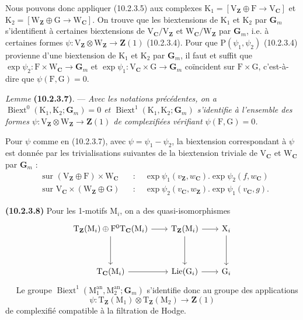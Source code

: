 \documentclass[11pt,leqno]{article}
\newcommand{\Page}[1]{\ifvmode\noindent\else\unskip\ \fi{\footnotesize\textcolor{gray}{[p.\,#1]}}\ \ignorespaces}
\begin{document}
Nous pouvons donc appliquer (10.2.3.5) aux complexes
\(\mathrm{K}_1=[\mathrm{V}_{\mathbf{Z}}\oplus\mathrm{F}
\to\mathrm{V}_{\mathbf{C}}]\) et
\(\mathrm{K}_2=[\mathrm{W}_{\mathbf{Z}}\oplus\mathrm{G}
\to\mathrm{W}_{\mathbf{C}}]\).
On trouve que les biextensions de \(\mathrm{K}_1\) et
\(\mathrm{K}_2\) par \(\mathbf{G}_m\) s’identifient à certaines
biextensions de
\(\mathrm{V}_{\mathbf{C}}/\mathrm{V}_{\mathbf{Z}}\) et
\(\mathrm{W}_{\mathbf{C}}/\mathrm{W}_{\mathbf{Z}}\) par
\(\mathbf{G}_m\), i.e. à certaines formes
\(\psi:\mathrm{V}_{\mathbf{Z}}\otimes\mathrm{W}_{\mathbf{Z}}
\to\mathbf{Z}(1)\) (10.2.3.4).
Pour que \(\mathrm{P}(\psi_1,\psi_2)\) (10.2.3.4) provienne d’une
biextension de \(\mathrm{K}_1\) et \(\mathrm{K}_2\) par
\(\mathbf{G}_m\), il faut et suffit que
\(\exp\psi_2:\mathrm{F}\times\mathrm{W}_{\mathbf{C}}\to\mathbf{G}_m\)
et
\(\exp\psi_1:\mathrm{V}_{\mathbf{C}}\times\mathrm{G}\to\mathbf{G}_m\)
coïncident sur \(\mathrm{F}\times\mathrm{G}\), c’est-à-dire que
\(\psi(\mathrm{F},\mathrm{G})=0\).

\textit{Lemme} \textbf{(10.2.3.7)}. — \textit{Avec les notations
précédentes, on a
\(\operatorname{Biext}^{0}(\mathrm{K}_1,\mathrm{K}_2;\mathbf{G}_m)=0\)
et
\(\operatorname{Biext}^{1}(\mathrm{K}_1,\mathrm{K}_2;\mathbf{G}_m)\)
s’identifie à l’ensemble des formes
\(\psi:\mathrm{V}_{\mathbf{Z}}\otimes\mathrm{W}_{\mathbf{Z}}
\to\mathbf{Z}(1)\) de complexifiées vérifiant
\(\psi(\mathrm{F},\mathrm{G})=0\).}

Pour \(\psi\) comme en (10.2.3.7), avec \(\psi=\psi_1-\psi_2\),
la biextension correspondant à \(\psi\) est donnée par les
trivialisations suivantes de la biextension triviale de
\(\mathrm{V}_{\mathbf{C}}\) et \(\mathrm{W}_{\mathbf{C}}\) par
\(\mathbf{G}_m\) :
\[
\begin{aligned}
&\text{sur }(\mathrm{V}_{\mathbf{Z}}\oplus\mathrm{F})
\times\mathrm{W}_{\mathbf{C}}
&&:\quad \exp\psi_1(v_{\mathbf{Z}},w_{\mathbf{C}})
.\exp\psi_2(f,w_{\mathbf{C}})\\
&\text{sur }\mathrm{V}_{\mathbf{C}}\times
(\mathrm{W}_{\mathbf{Z}}\oplus\mathrm{G})
&&:\quad \exp\psi_2(v_{\mathbf{C}},w_{\mathbf{Z}})
.\exp\psi_1(v_{\mathbf{C}},g).
\end{aligned}
\]

\textbf{(10.2.3.8)} Pour les 1-motifs \(\mathrm{M}_i\), on a des
quasi-isomorphismes
\[
\begin{tikzcd}[row sep=3.5em, column sep=2em]
\mathrm{T}_{\mathbf{Z}}(\mathrm{M}_i)\oplus
\mathrm{F}^{0}\mathrm{T}_{\mathbf{C}}(\mathrm{M}_i)
  \arrow[r] \arrow[d]
&
\mathrm{T}_{\mathbf{Z}}(\mathrm{M}_i)
  \arrow[r] \arrow[d]
&
\mathrm{X}_i \arrow[d]
\\
\mathrm{T}_{\mathbf{C}}(\mathrm{M}_i) \arrow[r]
&
\operatorname{Lie}(\mathrm{G}_i) \arrow[r]
&
\mathrm{G}_i
\end{tikzcd}
\]
\Page{63}
Le groupe
\(\operatorname{Biext}^{1}(\mathrm{M}_1^{\mathrm{an}},
\mathrm{M}_2^{\mathrm{an}};\mathbf{G}_m)\)
s’identifie donc au groupe des applications
\[
\psi:\mathrm{T}_{\mathbf{Z}}(\mathrm{M}_1)\otimes
\mathrm{T}_{\mathbf{Z}}(\mathrm{M}_2)\to\mathbf{Z}(1)
\]
de complexifié compatible à la filtration de Hodge.
\end{document}
